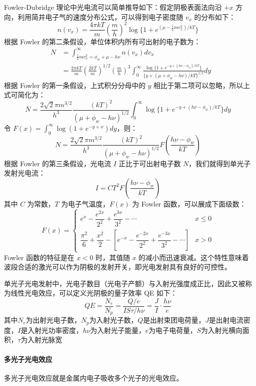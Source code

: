 Fowler-Dubridge 理论中光电流可以简单推导如下：假定阴极表面法向沿 $+x$ 方向，利用简并电子气的速度分布公式，可以得到电子密度随 $v_x$ 的分布如下：
	\[
	n(v_x) = \frac{4\pi kT}{m}\left(\frac{m}{h}\right)^2\log\{1+e^{(\mu-\frac{1}{2}mv_x^2)/kT}\}
	\]
	根据 Fowler 的第二条假设，单位体积内所有可出射的电子数为：
	\begin{eqnarray*}
	&N &= \int_{\frac{1}{2}mv_x^2=\phi_w+\mu-h\nu}^{\infty}n(v_x)dv_x\\
	&&= \frac{2\pi kT}{m}\left(\frac{2kT}{m}\right)^{1/2}\left(\frac{m}{h}\right)^3\int_0^{\infty}\frac{\log\{1+e^{-y+(h\nu-\phi_w)/kT}\}}{\{y+(\mu+\phi_w-h\nu)/kT\}^{1/2}}dy
	\end{eqnarray*}
	根据 Fowler 的第一条假设，上式积分分母中的 $y$ 相比于第二项可以忽略，所以上式可简化为：
	\[
	N = \frac{2\sqrt{2}\pi m^{3/2}}{h^3}\frac{(kT)^2}{(\mu+\phi_w-h\nu)^{1/2}}\int_0^{\infty}\log\{1+e^{-y+(h\nu-\phi_w)/kT}\}dy
	\]
	令 $F(x) = \int_0^{\infty}\log(1+e^{-y+x})dy$，则：
	\[
	N = \frac{2\sqrt{2}\pi m^{3/2}}{h^3}\frac{(kT)^2}{(\mu+\phi_w-h\nu)^{1/2}}F\left(\frac{h\nu-\phi_w}{kT}\right)
	\]
	根据 Fowler 的第三条假设，光电流 $I$ 正比于可出射电子数 $N$，我们就得到单光子发射光电流：
	\begin{equation}
	I = CT^2F\left(\frac{h\nu-\phi_w}{kT}\right)
	\end{equation}
	其中 $C$ 为常数，$T$ 为电子气温度，$F(x)$ 为 Fowler 函数，可以展成下面级数：
	\[
	F(x) =
	\begin{cases}
	e^x-\dfrac{e^{2x}}{2^2}+\dfrac{e^{3x}}{3^2}-\cdots & x \le 0\\[10pt]
	\dfrac{\pi^2}{6}+\dfrac{x^2}{2}-\left[e^{-x}-\dfrac{e^{-2x}}{2^2}+\dfrac{e^{-3x}}{3^2}-\cdots\right] & x > 0
	\end{cases}
	\]
	Fowler 函数的特征是在 $x < 0$ 时，其值随 $x$ 的减小而迅速衰减。这个特性意味着波段合适的激光可以作为阴极的发射开关，即光电发射具有良好的可控性。

单光子光电发射中，光电子数目（光电子产额）与入射光强度成正比，因此又被称为线性光电效应，可以定义光阴极的量子效率 QE 如下：
	  \begin{equation}
	  QE = \frac{N_e}{N_p} = \frac{Q/e}{IS\tau/h\nu} = \frac{J}{I}\cdot\frac{h\nu}{e}
	  \end{equation}
	  其中$N_e$为出射光电子数，$N_p$为入射光子数，$Q$是出射束团电荷量，$J$是出射电流密度，$I$是入射光功率密度，$h\nu$为入射光子能量，$e$为电子电荷量，$S$为入射光横向面积，$\tau$为入射光脉宽

\paragraph{多光子光电效应}
多光子光电效应就是金属内电子吸收多个光子的光电效应。

